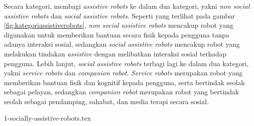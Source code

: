 Secara kategori, \citet{cit:heerink2010} membagi \emph{assistive robots} ke dalam dua kategori,
  yakni \emph{non social assistive robots} dan \emph{social assistive robots}.
Seperti yang terlihat pada gambar \ref{fig:kategoriassistiverobots},
\emph{non social assistive robots} mencakup robot yang digunakan untuk memberikan bantuan secara fisik kepada pengguna tanpa adanya interaksi sosial,
  sedangkan \emph{social assistive robots} mencakup robot yang melakukan tindakan \emph{assistive} dengan melibatkan interaksi sosial terhadap pengguna.
Lebih lanjut, \emph{social assistive robots} terbagi lagi ke dalam dua kategori,
  yakni \emph{service robots} dan \emph{companion robot}.
\emph{Service robots} merupakan robot yang memberikan bantuan fisik dan kognitif kepada pengguna,
  serta bertindak seolah sebagai pelayan,
  sedangkan \emph{companion robot} merupakan robot yang bertindak seolah sebagai pendamping,
  sahabat, dan media terapi secara sosial.

{1-socially-assistive-robots.tex}
